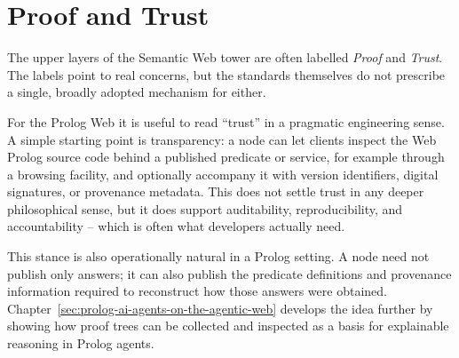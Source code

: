 \section{Proof and Trust}\label{sec:proof-and-trust}

The upper layers of the Semantic Web tower are often labelled \emph{Proof} and \emph{Trust}. The labels point to real concerns, but the standards themselves do not prescribe a single, broadly adopted mechanism for either.

For the Prolog Web it is useful to read ``trust'' in a pragmatic engineering sense. A simple starting point is transparency: a node can let clients inspect the Web Prolog source code behind a published predicate or service, for example through a browsing facility, and optionally accompany it with version identifiers, digital signatures, or provenance metadata. This does not settle trust in any deeper philosophical sense, but it does support auditability, reproducibility, and accountability -- which is often what developers actually need.

This stance is also operationally natural in a Prolog setting. A node need not publish only answers; it can also publish the predicate definitions and provenance information required to reconstruct how those answers were obtained. Chapter~\ref{sec:prolog-ai-agents-on-the-agentic-web} develops the idea further by showing how proof trees can be collected and inspected as a basis for explainable reasoning in Prolog agents.


%
%
%
%


